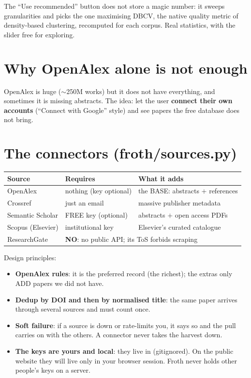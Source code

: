 \documentclass[11pt,a4paper]{article}
\begin{document}
\begin{resumen}
The ``Use recommended'' button does not store a magic number: it sweeps granularities and picks
the one maximising DBCV, the native quality metric of density-based clustering, recomputed for
each corpus. Real statistics, with the slider free for exploring.
\end{resumen}
\clearpage
{}
{}

\section{Why OpenAlex alone is not enough}

OpenAlex is huge ($\sim$250M works) but it does not have everything, and sometimes it is
missing abstracts. The idea: let the user \textbf{connect their own accounts} (``Connect with
Google'' style) and see papers the free database does not bring.

\section{The connectors (froth/sources.py)}

\begin{center}
\begin{tabular}{lll}
\textbf{Source} & \textbf{Requires} & \textbf{What it adds} \\
\hline
OpenAlex & nothing (key optional) & the BASE: abstracts $+$ references \\
Crossref & just an email & massive publisher metadata \\
Semantic Scholar & FREE key (optional) & abstracts $+$ open access PDFs \\
Scopus (Elsevier) & institutional key & Elsevier's curated catalogue \\
ResearchGate & \multicolumn{2}{l}{\textbf{NO}: no public API; its ToS forbids scraping} \\
\end{tabular}
\end{center}

Design principles:
\begin{itemize}
  \item \textbf{OpenAlex rules}: it is the preferred record (the richest); the extras only ADD
        papers we did not have.
  \item \textbf{Dedup by DOI and then by normalised title}: the same paper arrives through
        several sources and must count once.
  \item \textbf{Soft failure}: if a source is down or rate-limits you, it says so and the pull
        carries on with the others. A connector never takes the harvest down.
  \item \textbf{The keys are yours and local}: they live in 
        (gitignored). On the public website they will live only in your browser session.
        Froth never holds other people's keys on a server.
\end{itemize}
\end{document}

